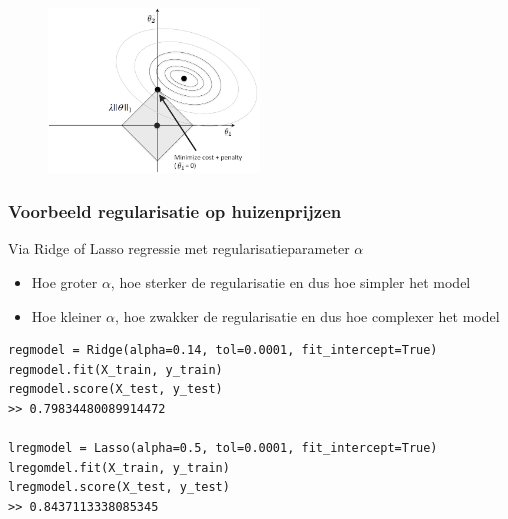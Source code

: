 \documentclass{article}
\begin{document}
\begin{figure}[H]
    \centering
    \includegraphics[width=0.5\textwidth]{regularisatie-l1.png}
    \caption{}
\end{figure}

\subsubsection{Voorbeeld regularisatie op huizenprijzen}

Via Ridge of Lasso regressie met regularisatieparameter $\alpha$

\begin{itemize}
    \item Hoe groter $\alpha$, hoe sterker de regularisatie en dus hoe simpler het model
    \item Hoe kleiner $\alpha$, hoe zwakker de regularisatie en dus hoe complexer het model
\end{itemize}

\begin{verbatim}
regmodel = Ridge(alpha=0.14, tol=0.0001, fit_intercept=True)
regmodel.fit(X_train, y_train)
regmodel.score(X_test, y_test)
>> 0.79834480089914472

lregmodel = Lasso(alpha=0.5, tol=0.0001, fit_intercept=True)
lregomdel.fit(X_train, y_train)
lregmodel.score(X_test, y_test)
>> 0.8437113338085345
\end{verbatim}
\end{document}
